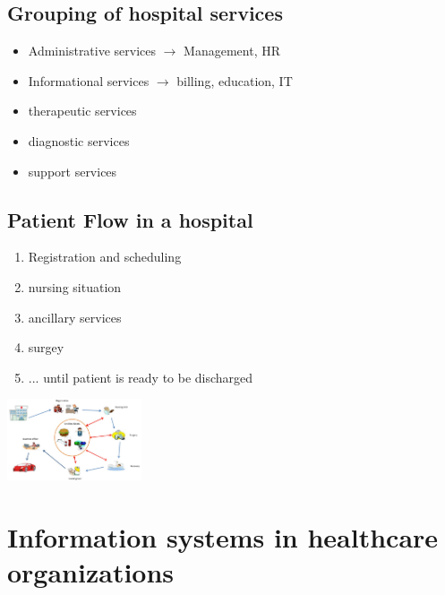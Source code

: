 \documentclass{report}
\newenvironment{Figure}
	{\par\medskip\noindent\minipage{\linewidth}}
	{\endminipage\par\medskip}
\theoremstyle{definition}
\theoremstyle{example}
\begin{document}
   \subsection{Grouping of hospital services}
   \begin{itemize}
      \item Administrative services $\rightarrow$ Management, HR
      \item Informational services $\rightarrow$ billing, education, IT
      \item therapeutic services
      \item diagnostic services
      \item support services
   \end{itemize}

   \subsection{Patient Flow in a hospital}
   \begin{enumerate}
      \item Registration and scheduling
      \item nursing situation
      \item ancillary services
      \item surgey
      \item ... until patient is ready to be discharged
   \end{enumerate}
   \begin{Figure}
      \centering
       \includegraphics[width=150px]{img/inpatienFlow.png}
           \label{fig:inpatient Flow}
       \end{Figure}

\section{Information systems in healthcare organizations}
\end{document}
